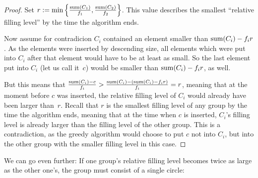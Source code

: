\documentclass[a4paper,style=print,oneside,bibliography=totoc,nexus,lnum,extramargin]{tubsbook}
\begin{document}
\begin{proof}
    Set $r := \min\left\{\frac{\operatorname{sum}(C_1)}{f_1},\frac{\operatorname{sum}(C_2)}{f_2}\right\}$. This value describes the smallest “relative filling level” by the time the algorithm ends.

    Now assume for contradicion $C_i$ contained an element smaller than $\operatorname{sum}(C_i) - f_i r$. As the elements were inserted by descending size, all elements which were put into $C_i$ after that element would have to be at least as small. So the last element put into $C_i$ (let us call it~$c$) would be smaller than $\operatorname{sum}(C_i) - f_i r$, as well.

    But this means that $\frac{\operatorname{sum}(C_i) - c}{f_i} > \frac{\operatorname{sum}(C_i) - (\operatorname{sum}(C_i) - f_i r)}{f_i} = r$, meaning that at the moment before $c$ was inserted, the relative filling level of $C_i$ would already have been larger than~$r$.
    Recall that $r$ is the smallest filling level of any group by the time the algorithm ends, meaning that at the time when $c$ is inserted, $C_i$'s filling level is already larger than the filling level of the other group.
    This is a contradiction, as the greedy algorithm would choose to put $c$ not into $C_i$, but into the other group with the smaller filling level in this case.
\end{proof}

We can go even further: If one group's relative filling level becomes twice as large as the other one's, the group must consist of a single circle:
\end{document}
